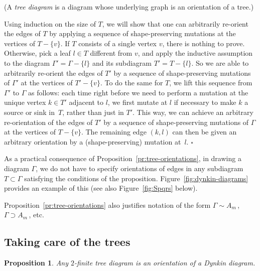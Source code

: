 \documentclass[letterpaper]{amsart}
\numberwithin{equation}{section}
\newtheorem{proposition}[theorem]{Proposition}
\theoremstyle{definition}
\def\proof{\smallskip\noindent {\bf Proof.\ }}
\def\endproof{\hfill$\square$\medskip}
\begin{document}
(A \emph{tree diagram} is a diagram whose underlying graph is an 
orientation of a tree.) 
 
\proof 
Using induction on the size of $T$, we will show that one can 
arbitrarily re-orient the edges of $T$ by applying a sequence of 
shape-preserving mutations at the vertices of $T - \{v\}$. 
If $T$ consists of a single vertex $v$, there is nothing to prove. 
Otherwise, pick a leaf $l \in T$ different from $v$, and apply the 
inductive assumption to the diagram $\Gamma' = \Gamma - \{l\}$ and 
its subdiagram $T' = T - \{l\}$. 
So we are able to arbitrarily re-orient the edges of $T'$ 
by a sequence of 
shape-preserving mutations of $\Gamma'$ at the vertices of $T' - \{v\}$. 
To do the same for $T$, we lift this sequence from $\Gamma'$ to $\Gamma$ 
as follows: each time right before we need to perform a mutation 
at the unique vertex $k \in T'$ adjacent to $l$, 
we first mutate at $l$ if necessary to 
make $k$ a source or sink in~$T$, rather than just in $T'$. 
This way, we can achieve an arbitrary re-orientation of 
the edges of $T'$ by a sequence of 
shape-preserving mutations of $\Gamma$ at 
the vertices of $T - \{v\}$. 
The remaining edge $(k,l)$ can then be given an arbitrary 
orientation by a (shape-preserving) mutation at~$l$. 
\endproof 
 
As a practical consequence of Proposition~\ref{pr:tree-orientations}, 
in drawing a diagram $\Gamma$, we do not have to specify 
orientations of edges in any subdiagram $T\subset \Gamma$ 
satisfying the conditions  of the proposition. 
Figure~\ref{fig:dynkin-diagrams} provides an example of this 
(see also Figure~\ref{fig:Spqrs} below). 
 
Proposition~\ref{pr:tree-orientations} also justifies notation of the 
form $\Gamma\sim A_m\,$, $\Gamma\supset A_m\,$, etc. 
 
 
\subsection{Taking care of the trees} 
 
\begin{proposition} 
\label{pr:trees-Dynkin-vs-infty} 
Any $2$-finite tree diagram is an orientation of a Dynkin diagram. 
\end{proposition} 
 
\end{document}

